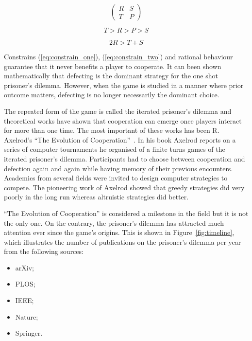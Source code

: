 \documentclass{article}
\theoremstyle{definition}
\begin{document}
\begin{equation} \label{eq:the_pd_payoffs}
    \begin{pmatrix}
    R & S \\ T & P
    \end{pmatrix}
\end{equation}

\begin{equation}\label{eq:constrain_one}
    T > R > P > S
\end{equation}

\begin{equation}\label{eq:constrain_two}
    2R > T + S
\end{equation}

Constrains (\ref{eq:constrain_one}), (\ref{eq:constrain_two}) and rational behaviour
guarantee that it never benefits a player to cooperate. It can been shown mathematically that
defecting is the dominant strategy for the one shot prisoner's dilemma. However,
when the game is studied in a manner where prior outcome matters,
defecting is no longer necessarily the dominant choice.

The repeated form of the game is called the iterated prisoner's dilemma and theoretical
works have shown that cooperation can emerge once players interact for more than
one time. The most important of these works has been R. Axelrod's
``The Evolution of Cooperation''~\cite{Axelrod1984}.
In his book Axelrod reports on a series of computer tournaments he organised of
a finite turns games of the iterated prisoner's dilemma. Participants
had to choose between cooperation and defection again and again while having
memory of their previous encounters. Academics from several fields were invited to
design computer strategies to compete. The pioneering work of Axelrod
showed that greedy strategies did very poorly in the long run whereas altruistic
strategies did better.

``The Evolution of Cooperation'' is considered a milestone in the field but it
is not the only one. On the contrary, the prisoner's dilemma has attracted much
attention ever since the game's origins. This is shown in Figure~\ref{fig:timeline},
which illustrates the number of publications on the prisoner's dilemma per year
from the following sources:

\begin{multicols}{3}
    \begin{itemize}
        \item arXiv;
        \item PLOS;
        \item IEEE;
        \item Nature;
        \item Springer.
    \end{itemize}
\end{multicols}
\end{document}
